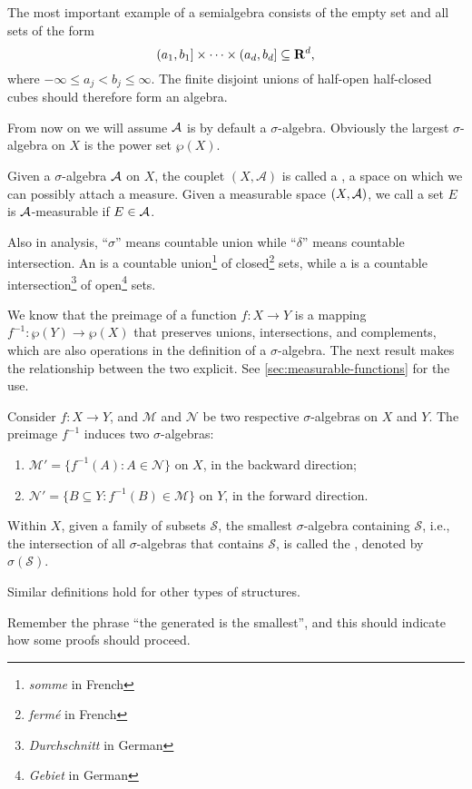 The most important example of a semialgebra consists of the empty set and all sets of the form \[
    (a_1,b_1] \times \dotsb \times (a_d,b_d] \subseteq \mathbf{R}^d,
\] where $-\infty \leq a_j<b_j \leq \infty$. The finite disjoint unions of half-open half-closed cubes should therefore form an algebra.

From now on we will assume $\mathcal{A}$ is by default a $\sigma$-algebra. Obviously the largest $\sigma$-algebra on $X$ is the power set $\wp(X)$.

Given a $\sigma$-algebra $\mathcal{A}$ on $X$, the couplet $(X,\mathcal{A})$ is called a , a space on which we can possibly attach a measure. Given a measurable space $(X,\mathcal{A})$, we call a set $E$ is $\mathcal{A}$-measurable if $E\in \mathcal{A}$.

Also in analysis, ``$\sigma$'' means countable union while ``$\delta$'' means countable intersection. An  is a countable union\footnote{\emph{somme} in French} of closed\footnote{\emph{fermé} in French} sets, while a  is a countable intersection\footnote{\emph{Durchschnitt} in German} of open\footnote{\emph{Gebiet} in German} sets.

We know that the preimage of a function $f\colon X \to Y$ is a mapping $f^{-1}\colon \wp(Y) \to \wp(X)$ that preserves unions, intersections, and complements, which are also operations in the definition of a $\sigma$-algebra. The next result makes the relationship between the two explicit. See \cref{sec:measurable-functions} for the use.
\begin{prop} \label{prop:induce-s-alg-meas-map}
    Consider $f\colon X \to Y$, and $\mathcal{M}$ and $\mathcal{N}$ be two respective $\sigma$-algebras on $X$ and $Y$. The preimage $f^{-1}$ induces two $\sigma$-algebras: \begin{enumerate}
        \item \label{enu:backward-ind-s-alg} $\mathcal{M}' =\{f^{-1}(A) : A \in \mathcal{N}\}$ on $X$, in the backward direction; 
        \item \label{enu:forward-ind-s-alg} $\mathcal{N}' = \{B \subseteq Y : f^{-1}(B) \in \mathcal{M}\}$ on $Y$, in the forward direction.
    \end{enumerate}
\end{prop}

\begin{defn}
    Within $X$, given a family of subsets $\mathcal{S}$, the smallest $\sigma$-algebra containing $\mathcal{S}$, i.e., the intersection of all $\sigma$-algebras that contains $\mathcal{S}$, is called the  , denoted by $\sigma(\mathcal{S})$.

    Similar definitions hold for other types of structures.
\end{defn}
Remember the phrase ``the generated is the smallest'', and this should indicate how some proofs should proceed.

